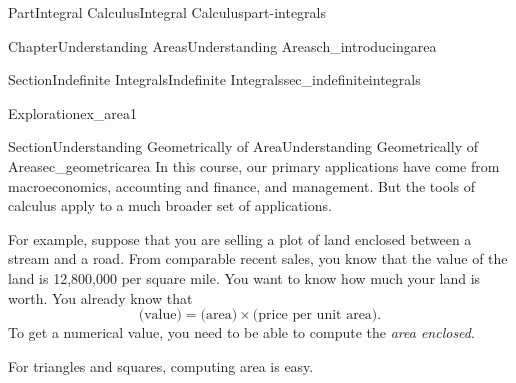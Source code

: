 \documentclass{tufte-book}
\numberwithin{equation}{chapter}
\begin{document}
\begin{partptx}{Part}{Integral Calculus}{}{Integral Calculus}{}{}{part-integrals}
\begin{chapterptx}{Chapter}{Understanding Areas}{}{Understanding Areas}{}{}{ch_introducingarea}
\begin{sectionptx}{Section}{Indefinite Integrals}{}{Indefinite Integrals}{}{}{sec_indefiniteintegrals}
\begin{exploration}{Exploration}{}{ex_area1}
\begin{enumerate}[font=\bfseries,label=(\alph*),ref=\alph*]
\end{enumerate}%
\end{exploration}%
\end{sectionptx}
%
%
\typeout{************************************************}
\typeout{************************************************}
%
\begin{sectionptx}{Section}{Understanding Geometrically of Area}{}{Understanding Geometrically of Area}{}{}{sec_geometricarea}
In this course, our primary applications have come from macroeconomics, accounting and finance, and management. But the tools of calculus apply to a much broader set of applications.%
\par
For example, suppose that you are selling a plot of land enclosed between a stream and a road. From comparable recent sales, you know that the value of the land is \textdollar{}12,800,000 \textdollar{} per square mile. You want to know how much your land is worth. You already know that%
\begin{equation*}
\text{(value)} = \text{(area)} \times \text{(price per unit area)}\text{.}
\end{equation*}
To get a numerical value, you need to be able to compute the \emph{area enclosed}.%
\begin{image}{0.25}{0.5}{0.25}{}%
%
\end{image}%
For triangles and squares, computing area is easy.%
\begin{enumerate}

\end{enumerate}
\end{sectionptx}
\end{chapterptx}
\end{partptx}
\end{document}
